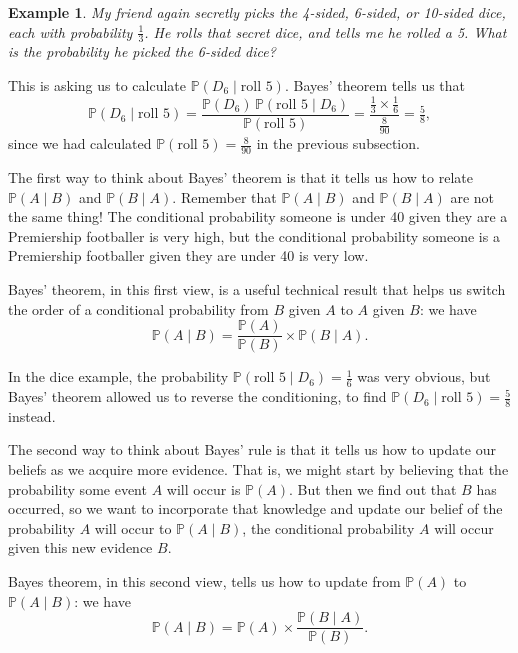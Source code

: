 \documentclass[
  a4paper,
]{book}
\theoremstyle{definition}
\theoremstyle{definition}
\newtheorem{example}{Example}[chapter]
\theoremstyle{definition}
\theoremstyle{definition}
\theoremstyle{remark}
\begin{document}
\begin{example}
\emph{My friend again secretly picks the 4-sided, 6-sided, or 10-sided dice, each with probability \(\frac13\). He rolls that secret dice, and tells me he rolled a 5. What is the probability he picked the 6-sided dice?}

This is asking us to calculate \(\mathbb P(D_6 \mid \text{roll 5})\). Bayes' theorem tells us that
\[
  \mathbb P(D_6 \mid \text{roll 5})
  = \frac{\mathbb P(D_6) \, \mathbb P(\text{roll 5} \mid D_6)}{\mathbb P(\text{roll 5})} 
  = \frac{\frac13 \times \frac16}{\frac{8}{90}} 
  = \tfrac{5}{8} ,
\]
since we had calculated \(\mathbb P(\text{roll 5}) = \frac{8}{90}\) in the previous subsection.
\end{example}

The first way to think about Bayes' theorem is that it tells us how to relate \(\mathbb P(A \mid B)\) and \(\mathbb P(B \mid A)\). Remember that \(\mathbb P(A \mid B)\) and \(\mathbb P(B \mid A)\) are not the same thing! The conditional probability someone is under 40 given they are a Premiership footballer is very high, but the conditional probability someone is a Premiership footballer given they are under 40 is very low.

Bayes' theorem, in this first view, is a useful technical result that helps us switch the order of a conditional probability from \(B\) given \(A\) to \(A\) given \(B\): we have
\[ \mathbb P(A \mid B) = \frac{\mathbb P(A)}{\mathbb P(B)} \times \mathbb P(B \mid A) .  \]

In the dice example, the probability \(\mathbb P(\text{roll 5} \mid D_6) = \frac16\) was very obvious, but Bayes' theorem allowed us to reverse the conditioning, to find \(\mathbb P(D_6 \mid \text{roll 5}) = \frac58\) instead.

The second way to think about Bayes' rule is that it tells us how to update our beliefs as we acquire more evidence. That is, we might start by believing that the probability some event \(A\) will occur is \(\mathbb P(A)\). But then we find out that \(B\) has occurred, so we want to incorporate that knowledge and update our belief of the probability \(A\) will occur to \(\mathbb P(A \mid B)\), the conditional probability \(A\) will occur given this new evidence \(B\).

Bayes theorem, in this second view, tells us how to update from \(\mathbb P(A)\) to \(\mathbb P(A \mid B)\): we have
\[ \mathbb P(A \mid B) = \mathbb P(A) \times \frac{\mathbb P(B \mid A)}{\mathbb P(B)} .  \]
\end{document}
